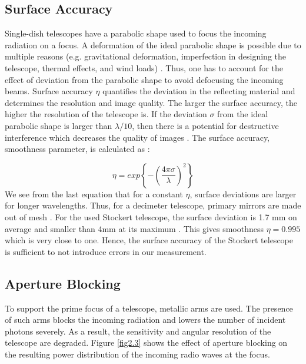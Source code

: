 \documentclass[12pt]{article}
\begin{document}
        \subsection{Surface Accuracy}
        Single-dish telescopes have a parabolic shape used to focus the incoming radiation on a focus. A deformation of the ideal parabolic shape is possible due to multiple reasons (e.g. gravitational deformation, imperfection in designing the telescope, thermal effects, and wind loads) \cite{deformation}. Thus, one has to account for the effect of deviation from the parabolic shape to avoid defocusing the incoming beams. Surface accuracy $\eta$ quantifies the deviation in the reflecting material and determines the resolution and image quality. The larger the surface accuracy, the higher the resolution of the telescope is. If the deviation $\sigma$ from the ideal parabolic shape is larger than $\lambda /10$, then there is a potential for destructive interference which decreases the quality of images \cite{fundamentals}.  The surface accuracy, smoothness parameter, is calculated as \cite{lecturenote}:

        \begin{equation}
            \eta = exp \left\{ -(\frac{4 \pi \sigma}{\lambda})^{2} \right\}
            \label{accuracy}
        \end{equation}
        We see from the last equation that for a constant $\eta$, surface deviations are larger for longer wavelengths. Thus, for a decimeter telescope, primary mirrors are made out of mesh \cite{essential}. For the used Stockert telescope, the surface deviation is 1.7 mm on average and smaller than 4mm at its maximum \cite{accuracy}. This gives smoothness $\eta = 0.995$ which is very close to one. Hence, the surface accuracy of the Stockert telescope is sufficient to not introduce errors in our measurement. 
        
        \subsection{Aperture Blocking}

        To support the prime focus of a telescope, metallic arms are used. The presence of such arms blocks the incoming radiation and lowers the number of incident photons severely. As a result, the sensitivity and angular resolution of the telescope are degraded. Figure \ref{fig2.3} shows the effect of aperture blocking on the resulting power distribution of the incoming radio waves at the focus. 
\end{document}
